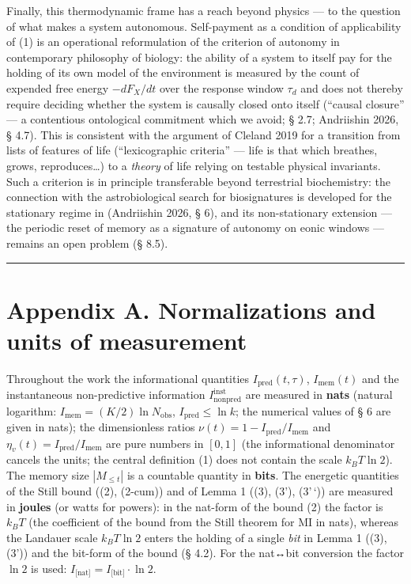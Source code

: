 \documentclass[pdflatex,sn-mathphys-ay]{sn-jnl}
\begin{document}
Finally, this thermodynamic frame has a reach beyond physics --- to the question of what makes a system autonomous. Self-payment as a condition of applicability of (1) is an operational reformulation of the criterion of autonomy in contemporary philosophy of biology: the ability of a system to itself pay for the holding of its own model of the environment is measured by the count of expended free energy \(-dF_X/dt\) over the response window \(\tau_d\) and does not thereby require deciding whether the system is causally closed onto itself (``causal closure'' --- a contentious ontological commitment which we avoid; § 2.7; Andriishin 2026, § 4.7). This is consistent with the argument of Cleland 2019 for a transition from lists of features of life (``lexicographic criteria'' --- life is that which breathes, grows, reproduces\ldots) to a \emph{theory} of life relying on testable physical invariants. Such a criterion is in principle transferable beyond terrestrial biochemistry: the connection with the astrobiological search for biosignatures is developed for the stationary regime in (Andriishin 2026, § 6), and its non-stationary extension --- the periodic reset of memory as a signature of autonomy on eonic windows --- remains an open problem (§ 8.5).



\begin{center}\rule{0.5\linewidth}{0.5pt}\end{center}



\section{Appendix A. Normalizations and units of measurement}\label{appendix-a.-normalizations-and-units-of-measurement}



Throughout the work the informational quantities \(I_{\text{pred}}(t,\tau)\), \(I_{\text{mem}}(t)\) and the instantaneous non-predictive information \(I_{\text{nonpred}}^{\text{inst}}\) are measured in \textbf{nats} (natural logarithm: \(I_{\text{mem}} = (K/2)\ln N_{\text{obs}}\), \(I_{\text{pred}} \le \ln k\); the numerical values of § 6 are given in nats); the dimensionless ratios \(\nu(t) = 1 - I_{\text{pred}}/I_{\text{mem}}\) and \(\eta_v(t) = I_{\text{pred}}/I_{\text{mem}}\) are pure numbers in \([0,1]\) (the informational denominator cancels the units; the central definition (1) does not contain the scale \(k_B T \ln 2\)). The memory size \(|M_{\le t}|\) is a countable quantity in \textbf{bits}. The energetic quantities of the Still bound ((2), (2-cum)) and of Lemma 1 ((3), (3'), (3'\,`)) are measured in \textbf{joules} (or watts for powers): in the nat-form of the bound (2) the factor is \(k_B T\) (the coefficient of the bound from the Still theorem for MI in nats), whereas the Landauer scale \(k_B T \ln 2\) enters the holding of a single \emph{bit} in Lemma 1 ((3), (3')) and the bit-form of the bound (§ 4.2). For the nat↔bit conversion the factor \(\ln 2\) is used: \(I_{\text{[nat]}} = I_{\text{[bit]}} \cdot \ln 2\).
\end{document}
